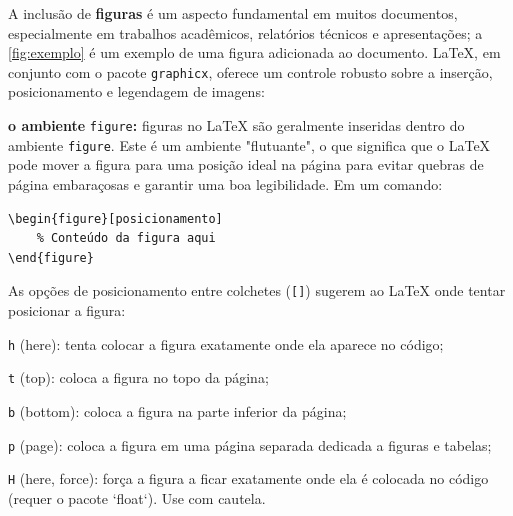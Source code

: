 A inclusão de \textbf{figuras} é um aspecto fundamental em muitos documentos, especialmente em trabalhos acadêmicos, relatórios técnicos e apresentações; a \autoref{fig:exemplo} é um exemplo de uma figura adicionada ao documento. \LaTeX, em conjunto com o pacote \texttt{graphicx}, oferece um controle robusto sobre a inserção, posicionamento e legendagem de imagens:

\begin{alineas}
	\item \textbf{o ambiente} \texttt{figure}\textbf{:} figuras no LaTeX são geralmente inseridas dentro do ambiente \texttt{figure}. Este é um ambiente "flutuante", o que significa que o LaTeX pode mover a figura para uma posição ideal na página para evitar quebras de página embaraçosas e garantir uma boa legibilidade. Em um comando:
	\begin{lstlisting}[language={[LaTeX]TeX}]
\begin{figure}[posicionamento]
	% Conteúdo da figura aqui
\end{figure}
	\end{lstlisting}
	As opções de posicionamento entre colchetes (\texttt{[]}) sugerem ao LaTeX onde tentar posicionar a figura:
	\begin{alineas}
		\item \texttt{h} (here): tenta colocar a figura exatamente onde ela aparece no código;
		\item \texttt{t} (top): coloca a figura no topo da página;
		\item \texttt{b} (bottom): coloca a figura na parte inferior da página;
		\item \texttt{p} (page): coloca a figura em uma página separada dedicada a figuras e tabelas;
		\item \texttt{H} (here, force): força a figura a ficar exatamente onde ela é colocada no código (requer o pacote `float`). Use com cautela.
	\end{alineas}
	

\end{alineas}
